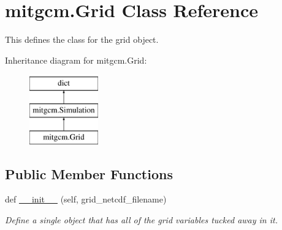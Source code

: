 \hypertarget{classmitgcm_1_1Grid}{}\section{mitgcm.\+Grid Class Reference}
\label{classmitgcm_1_1Grid}


This defines the class for the grid object.  


Inheritance diagram for mitgcm.\+Grid\+:\begin{figure}[H]
\begin{center}
\leavevmode
\includegraphics[height=3.000000cm]{classmitgcm_1_1Grid}
\end{center}
\end{figure}
\subsection*{Public Member Functions}
\begin{DoxyCompactItemize}
\item 
def \hyperlink{classmitgcm_1_1Grid_affd7f1aca1676422acd1664cf63ca10d}{\+\_\+\+\_\+init\+\_\+\+\_\+} (self, grid\+\_\+netcdf\+\_\+filename)
\begin{DoxyCompactList}\small\item\em Define a single object that has all of the grid variables tucked away in it. \end{DoxyCompactList}\end{DoxyCompactItemize}
